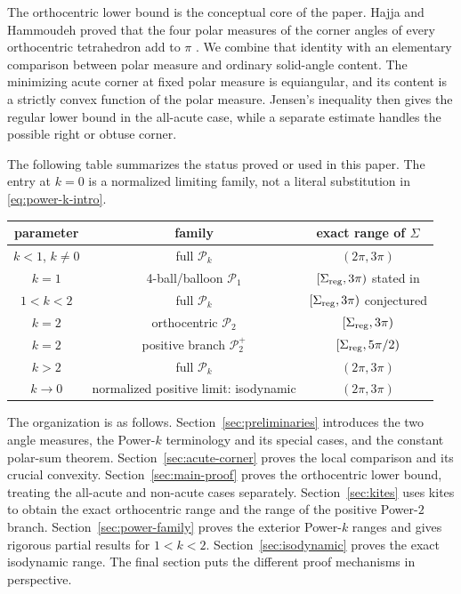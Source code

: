 \documentclass[11pt,a4paper]{article}
\theoremstyle{definition}
\theoremstyle{remark}
\begin{document}
The orthocentric lower bound is the conceptual core of the paper.  Hajja and
Hammoudeh proved that the four polar measures of the corner angles of every
orthocentric tetrahedron add to $\pi$ \cite[Theorem~1(b)]{HajjaHammoudeh2014}.
We combine that identity with an elementary comparison between polar measure
and ordinary solid-angle content.  The minimizing acute corner at fixed polar
measure is equiangular, and its content is a strictly convex function of the
polar measure.  Jensen's inequality then gives the regular lower bound in the
all-acute case, while a separate estimate handles the possible right or
obtuse corner.

The following table summarizes the status proved or used in this paper.  The
entry at $k=0$ is a normalized limiting family, not a literal substitution in
\eqref{eq:power-k-intro}.
\begin{center}
\renewcommand{\arraystretch}{1.18}
\begin{tabular}{ccc}
\toprule
parameter & family & exact range of $\Sigma$ \\
\midrule
$k<1$, $k\ne0$ & full $\mathcal P_k$ & $(2\pi,3\pi)$ \\
$k=1$ & 4-ball/balloon $\mathcal P_1$ & $[\Sigma_{\rm reg},3\pi)$ stated in \cite{KorotovKrizek2026} \\
$1<k<2$ & full $\mathcal P_k$ & $[\Sigma_{\rm reg},3\pi)$ conjectured \\
$k=2$ & orthocentric $\mathcal P_2$ & $[\Sigma_{\rm reg},3\pi)$ \\
$k=2$ & positive branch $\mathcal P_2^+$ & $[\Sigma_{\rm reg},5\pi/2)$ \\
$k>2$ & full $\mathcal P_k$ & $(2\pi,3\pi)$ \\
$k\to0$ & normalized positive limit: isodynamic & $(2\pi,3\pi)$
\\
\bottomrule
\end{tabular}
\end{center}

The organization is as follows.  Section~\ref{sec:preliminaries} introduces
the two angle measures, the Power-$k$ terminology and its special cases, and
the constant polar-sum theorem.  Section~\ref{sec:acute-corner} proves the
local comparison and its crucial convexity.  Section~\ref{sec:main-proof}
proves the orthocentric lower bound, treating the all-acute and non-acute
cases separately.  Section~\ref{sec:kites} uses kites to obtain the exact
orthocentric range and the range of the positive Power-$2$ branch.
Section~\ref{sec:power-family} proves the exterior Power-$k$ ranges and gives
rigorous partial results for $1<k<2$.  Section~\ref{sec:isodynamic} proves the
exact isodynamic range.  The final section puts the different proof
mechanisms in perspective.
\end{document}
